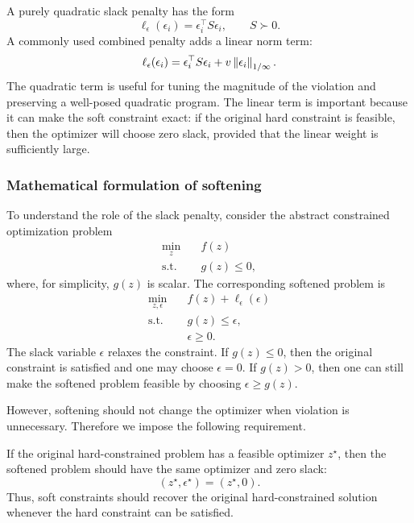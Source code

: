 A purely quadratic slack penalty has the form
\[
    \ell_\epsilon(\epsilon_i)=\epsilon_i^\top S\epsilon_i,
    \qquad S\succ0.
\]
A commonly used combined penalty adds a linear norm term:
\[
    \ell_\epsilon(\epsilon_i)
    =
    \epsilon_i^\top S\epsilon_i
    +
    v\left\lVert \epsilon_i \right\rVert_{1/\infty}.
\]
The quadratic term is useful for tuning the magnitude of the violation and preserving a
well-posed quadratic program. The linear term is important because it can make the soft
constraint exact: if the original hard constraint is feasible, then the optimizer will choose zero
slack, provided that the linear weight is sufficiently large.

\subsubsection{Mathematical formulation of softening}

To understand the role of the slack penalty, consider the abstract constrained optimization
problem
\[
\begin{aligned}
    \min_z \quad & f(z)\\
    \text{s.t.}\quad & g(z)\le0,
\end{aligned}
\]
where, for simplicity, \(g(z)\) is scalar. The corresponding softened problem is
\[
\begin{aligned}
    \min_{z,\epsilon}\quad & f(z)+\ell_\epsilon(\epsilon)\\
    \text{s.t.}\quad & g(z)\le\epsilon,\\
    & \epsilon\ge0.
\end{aligned}
\]
The slack variable \(\epsilon\) relaxes the constraint. If \(g(z)\le0\), then the original constraint
is satisfied and one may choose \(\epsilon=0\). If \(g(z)>0\), then one can still make the
softened problem feasible by choosing \(\epsilon\ge g(z)\).

However, softening should not change the optimizer when violation is unnecessary. Therefore
we impose the following requirement.

\begin{theorembox}
If the original hard-constrained problem has a feasible optimizer \(z^\star\), then the softened
problem should have the same optimizer and zero slack:
\[
    (z^\star,\epsilon^\star)=(z^\star,0).
\]
Thus, soft constraints should recover the original hard-constrained solution whenever the hard
constraint can be satisfied.
\end{theorembox}

